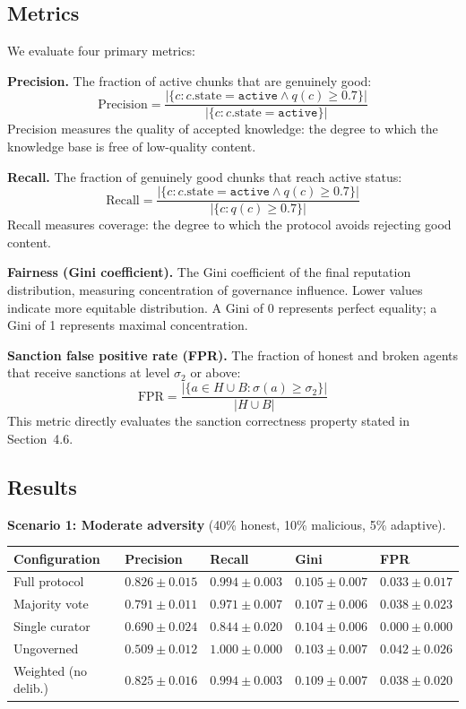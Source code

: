 \documentclass[11pt]{article}
\begin{document}
\subsection{Metrics}

We evaluate four primary metrics:

\textbf{Precision.} The fraction of active chunks that are genuinely good:
\[
\text{Precision} = \frac{|\{c : c.\text{state} = \texttt{active} \wedge q(c) \geq 0.7\}|}{|\{c : c.\text{state} = \texttt{active}\}|}
\]
Precision measures the quality of accepted knowledge: the degree to which the knowledge base is free of low-quality content.

\textbf{Recall.} The fraction of genuinely good chunks that reach active status:
\[
\text{Recall} = \frac{|\{c : c.\text{state} = \texttt{active} \wedge q(c) \geq 0.7\}|}{|\{c : q(c) \geq 0.7\}|}
\]
Recall measures coverage: the degree to which the protocol avoids rejecting good content.

\textbf{Fairness (Gini coefficient).} The Gini coefficient of the final reputation distribution, measuring concentration of governance influence. Lower values indicate more equitable distribution. A Gini of 0 represents perfect equality; a Gini of 1 represents maximal concentration.

\textbf{Sanction false positive rate (FPR).} The fraction of honest and broken agents that receive sanctions at level $\sigma_2$ or above:
\[
\text{FPR} = \frac{|\{a \in H \cup B : \sigma(a) \geq \sigma_2\}|}{|H \cup B|}
\]
This metric directly evaluates the sanction correctness property stated in Section~4.6.

\subsection{Results}

\textbf{Scenario 1: Moderate adversity} (40\% honest, 10\% malicious, 5\% adaptive).

\begin{table}[h]
\centering
\small
\begin{tabular}{lllll}
\toprule
\textbf{Configuration} & \textbf{Precision} & \textbf{Recall} & \textbf{Gini} & \textbf{FPR} \\
\midrule
Full protocol & $0.826 \pm 0.015$ & $0.994 \pm 0.003$ & $0.105 \pm 0.007$ & $0.033 \pm 0.017$ \\
Majority vote & $0.791 \pm 0.011$ & $0.971 \pm 0.007$ & $0.107 \pm 0.006$ & $0.038 \pm 0.023$ \\
Single curator & $0.690 \pm 0.024$ & $0.844 \pm 0.020$ & $0.104 \pm 0.006$ & $0.000 \pm 0.000$ \\
Ungoverned & $0.509 \pm 0.012$ & $1.000 \pm 0.000$ & $0.103 \pm 0.007$ & $0.042 \pm 0.026$ \\
Weighted (no delib.) & $0.825 \pm 0.016$ & $0.994 \pm 0.003$ & $0.109 \pm 0.007$ & $0.038 \pm 0.020$ \\
\bottomrule
\end{tabular}
\end{table}
\end{document}
